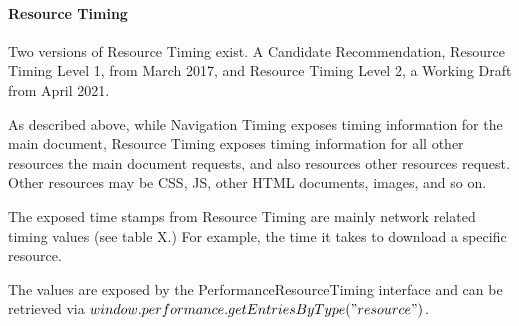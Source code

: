 





\paragraph{Resource Timing}



Two versions of Resource Timing exist.
A Candidate Recommendation, Resource Timing Level 1, from March 2017, %
and Resource Timing Level 2, a Working Draft from April 2021.  %

As described above, while Navigation Timing exposes timing information for the main document, Resource Timing exposes timing information for all other resources the main document requests, and also resources other resources request.
Other resources may be CSS, JS, other HTML documents, images, and so on.

The exposed time stamps from Resource Timing are mainly network related timing values (see table X.)
For example, the time it takes to download a specific resource.



The values are exposed by the PerformanceResourceTiming interface and can be retrieved via $window.performance.getEntriesByType("resource")$.



